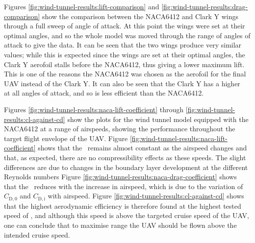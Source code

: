 \documentclass[../../main.tex]{subfiles}
\begin{document}
Figures \ref{fig:wind-tunnel-results:lift-comparison} and \ref{fig:wind-tunnel-results:drag-comparison} show the comparison between the NACA6412 and Clark Y wings through a full sweep of angle of attack.
At this point the wings were set at their optimal angles, and so the whole model was moved through the range of angles of attack to give the data.
It can be seen that the two wings produce very similar \cl\, values; while this is expected since the wings are set at their optimal angles, the Clark Y aerofoil stalls before the NACA6412, thus giving a lower maximum lift.
This is one of the reasons the NACA6412 was chosen as the aerofoil for the final UAV instead of the Clark Y.
It can also be seen that the Clark Y has a higher \cd\, at all angles of attack, and so is less efficient than the NACA6412.

Figures \ref{fig:wind-tunnel-results:naca-lift-coefficient} through \ref{fig:wind-tunnel-results:cl-against-cd} show the plots for the wind tunnel model equipped with the NACA6412 at a range of airspeeds, showing the performance throughout the target flight envelope of the UAV.
Figure \ref{fig:wind-tunnel-results:naca-lift-coefficient} shows that the \cl\, remains almost constant as the airspeed changes and that, as expected, there are no compressibility effects as these speeds. The slight differences are due to changes in the boundary layer development at the different Reynolds numbers
Figure \ref{fig:wind-tunnel-results:naca-drag-coefficient} shows that the \cd\, reduces with the increase in airspeed, which is due to the variation of $C_\mathrm{D,0}$ and $C_\mathrm{D,i}$ with airspeed.
Figure \ref{fig:wind-tunnel-results:cl-against-cd} shows that the highest aerodynamic efficiency is therefore found at the highest tested speed of , and although this speed is above the targeted cruise speed of the UAV, one can conclude that to maximise range the UAV should be flown above the intended cruise speed. 

\newcommand{\multiimagewidth}{0.4}
\end{document}
